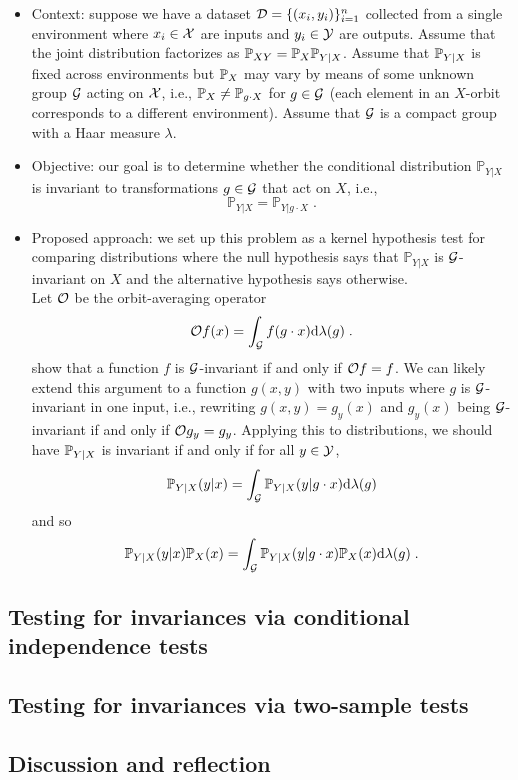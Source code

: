 \begin{itemize}

\item
Context: suppose we have a dataset $\mathcal{D}=\{(x_i,y_i)\}_{i=1}^n$ collected from a single environment where $x_i\in\mathcal{X}$ are inputs and $y_i\in\mathcal{Y}$ are outputs. Assume that the joint distribution factorizes as $\mathbb{P}_{XY}=\mathbb{P}_X\mathbb{P}_{Y|X}$. Assume that $\mathbb{P}_{Y|X}$ is fixed across environments but $\mathbb{P}_X$ may vary by means of some unknown group $\mathcal{G}$ acting on $\mathcal{X}$, i.e., $\mathbb{P}_X\neq\mathbb{P}_{g\cdot X}$ for $g\in\mathcal{G}$ (each element in an $X$-orbit corresponds to a different environment). Assume that $\mathcal{G}$ is a compact group with a Haar measure $\lambda$.

\item
Objective: our goal is to determine whether the conditional distribution $\mathbb{P}_{Y|X}$ is invariant to transformations $g\in\mathcal{G}$ that act on $X$, i.e.,
\[
\mathbb{P}_{Y|X}=\mathbb{P}_{Y|g\cdot X}\;.
\]

\item
Proposed approach: we set up this problem as a kernel hypothesis test for comparing distributions where the null hypothesis says that $\mathbb{P}_{Y|X}$ is $\mathcal{G}$-invariant on $X$ and the alternative hypothesis says otherwise.
\\

Let $\mathcal{O}$ be the orbit-averaging operator \parencite{Elesedy:2021}
\[
\mathcal{O} f(x) = \int_{\mathcal{G}} f(g\cdot x)\mathrm{d}\lambda(g)\;.
\]
\parencite{Elesedy:2021,Elesedy:2021:equivariant} show that a function $f$ is $\mathcal{G}$-invariant if and only if $\mathcal{O} f=f$. We can likely extend this argument to a function $g(x,y)$ with two inputs where $g$ is $\mathcal{G}$-invariant in one input, i.e., rewriting $g(x,y)=g_y(x)$ and $g_y(x)$ being $\mathcal{G}$-invariant if and only if $\mathcal{O} g_y = g_y$. Applying this to distributions, we should have $\mathbb{P}_{Y|X}$ is invariant if and only if for all $y\in\mathcal{Y}$,
\[
\mathbb{P}_{Y|X}(y|x)=\int_{\mathcal{G}}\mathbb{P}_{Y|X}(y|g\cdot x)\mathrm{d}\lambda(g)
\]
and so
\[
\mathbb{P}_{Y|X}(y|x)\mathbb{P}_X(x)=\int_{\mathcal{G}}\mathbb{P}_{Y|X}(y|g\cdot x)\mathbb{P}_X(x)\mathrm{d}\lambda(g) \;.
\]

\end{itemize}
\fi


\subsection{Testing for invariances via conditional independence tests}

\subsection{Testing for invariances via two-sample tests}

\subsection{Discussion and reflection}